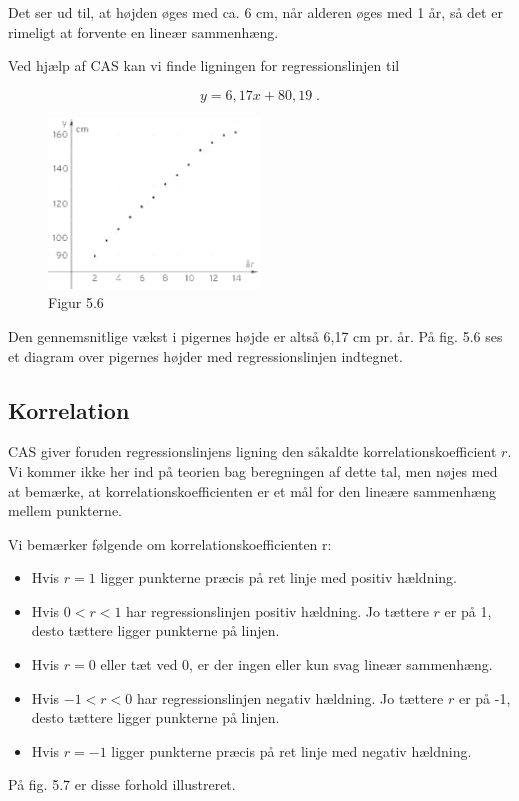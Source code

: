 \documentclass[12pt,oneside,a4paper]{article}
\begin{document}
Det ser ud til, at højden øges med ca. 6 cm, når alderen øges med 1 år, så det
er rimeligt at forvente en lineær sammenhæng.

Ved hjælp af CAS kan vi finde ligningen for regressionslinjen til

$$
y = 6,17x + 80,19 \; .
$$

\begin{figure}[ht]
    \centering
    \includegraphics[width=0.5\textwidth]{fig56}
    \caption{Figur 5.6}
    \label{fig56}
\end{figure}

Den gennemsnitlige vækst i pigernes højde er altså 6,17 cm pr. år. På fig. 5.6
ses et diagram over pigernes højder med regressionslinjen indtegnet.

\subsection{Korrelation}
CAS giver foruden regressionslinjens ligning den såkaldte
korrelations\-koef\-fi\-cient $r$. Vi kommer ikke her ind på teorien bag beregningen af
dette tal, men nøjes med at bemærke, at korrelationskoefficienten er et mål for
den lineære sammenhæng mellem punkterne.

Vi bemærker følgende om korrelationskoefficienten r:

\begin{itemize}
    \item Hvis $r = 1$ ligger punkterne præcis på ret linje med positiv hældning.
    \item Hvis $0 < r < 1$ har regressionslinjen positiv hældning. Jo tættere $r$
        er på 1, desto tættere ligger punkterne på linjen.
    \item Hvis $r = 0$ eller tæt ved 0, er der ingen eller kun svag lineær sammenhæng.
    \item Hvis $-1 < r < 0$ har regressionslinjen negativ hældning. Jo tættere $r$
        er på -1, desto tættere ligger punkterne på linjen.
    \item Hvis $r = -1$ ligger punkterne præcis på ret linje med negativ hældning. 
\end{itemize}
På fig. 5.7 er disse forhold illustreret.
\end{document}
